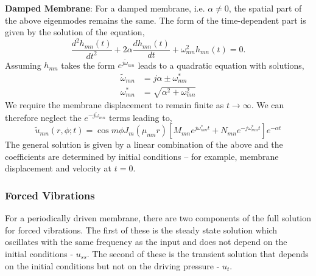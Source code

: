 \vspace{\baselineskip}
\noindent\textbf{Damped Membrane}: For a damped membrane, i.e. $\alpha\neq 0$, the spatial part of the above eigenmodes remains the same. The form of the
time-dependent part is given by the solution of the equation,
\begin{equation}\label{dampedtimepart}
 \frac{d^2 h_{mn}(t)}{dt^2}+2\alpha \frac{d h_{mn}(t)}{dt}+\omega_{mn}^2h_{mn}(t)=0.
\end{equation}
Assuming $h_{mn}$ takes the form $e^{j\widetilde{\omega}_{mn}}$ leads to a quadratic equation with solutions,
\begin{align}
 \widetilde{\omega}_{mn}&=j\alpha\pm\omega_{mn}^*\\
 \omega_{mn}^*&=\sqrt{\alpha^2+\omega^2_{mn}}
\end{align}
We require the membrane displacement to remain finite as $t\rightarrow\infty$. We can therefore neglect the $e^{-j\widetilde{\omega}_{mn}}$ terms leading
to,
\begin{equation}\label{circularmembranedampedeigen}
 \widetilde{u}_{mn}(r,\phi;t)=\cos m\phi J_m(\mu_{mn} r)\left[M_{mn}e^{j\omega_{mn}^* t}+N_{mn}e^{-j\omega_{mn}^* t}\right]e^{-\alpha t}
\end{equation}
The general solution is given by a linear combination of the above and the coefficients are determined by initial conditions -- for example,
membrane displacement and velocity at $t=0$.
\subsubsection*{Forced Vibrations}
For a periodically driven membrane, there are two components of the full solution for forced vibrations. The first of these is the steady state solution which
oscillates with the same frequency as the input and does not depend on the initial conditions - $u_{ss}$. The second of these is the transient solution that depends
on the initial conditions but not on the driving pressure - $u_t$. 

